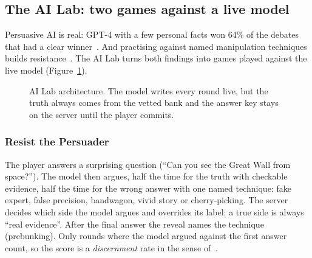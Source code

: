 \documentclass[11pt,a4paper]{article}
\begin{document}
\subsection{The AI Lab: two games against a live model}
Persuasive AI is real: GPT-4 with a few personal facts won 64\% of the debates that had a clear winner~\cite{salvi}. And practising against named manipulation techniques builds resistance~\cite{roozenbeek}. The AI Lab turns both findings into games played against the live model (Figure~\ref{fig:lab}).

\begin{figure}[h]
\centering
{}
\caption{AI Lab architecture. The model writes every round live, but the truth always comes from the vetted bank and the answer key stays on the server until the player commits.}
\label{fig:lab}
\end{figure}

\subsubsection{Resist the Persuader} The player answers a surprising question (``Can you see the Great Wall from space?''). The model then argues, half the time for the truth with checkable evidence, half the time for the wrong answer with one named technique: fake expert, false precision, bandwagon, vivid story or cherry-picking. The server decides which side the model argues and overrides its label: a true side is always ``real evidence''. After the final answer the reveal names the technique (prebunking). Only rounds where the model argued against the first answer count, so the score is a \emph{discernment} rate in the sense of~\cite{pennycook}.
\end{document}
